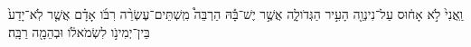 \documentclass{openreader}
\begin{document}
וַֽאֲנִי֙ לֹ֣א אָח֔וּס עַל־נִינְוֵ֖ה הָעִ֣יר הַגְּדֹולָ֑ה אֲשֶׁ֣ר יֶשׁ־בָּ֡הּ הַרְבֵּה֩ מִֽשְׁתֵּים־עֶשְׂרֵ֨ה רִבֹּ֜ו אָדָ֗ם אֲשֶׁ֤ר לֹֽא־יָדַע֙ בֵּין־יְמִינֹ֣ו לִשְׂמֹאלֹ֔ו וּבְהֵמָ֖ה רַבָּֽה׃ 
\end{document}
